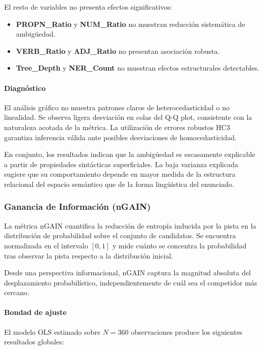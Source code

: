 \documentclass[../main.tex]{subfiles}
\begin{document}
El resto de variables no presenta efectos significativos:

\begin{itemize}
\item \textbf{PROPN\_Ratio} y \textbf{NUM\_Ratio} no muestran reducción sistemática de ambigüedad.
\item \textbf{VERB\_Ratio} y \textbf{ADJ\_Ratio} no presentan asociación robusta.
\item \textbf{Tree\_Depth} y \textbf{NER\_Count} no muestran efectos estructurales detectables.
\end{itemize}

\paragraph{Diagnóstico}

El análisis gráfico no muestra patrones claros de heterocedasticidad o no linealidad. Se observa ligera desviación en colas del Q-Q plot, consistente con la naturaleza acotada de la métrica. La utilización de errores robustos HC3 garantiza inferencia válida ante posibles desviaciones de homocedasticidad.

En conjunto, los resultados indican que la ambigüedad es escasamente explicable a partir de propiedades sintácticas superficiales. La baja varianza explicada sugiere que su comportamiento depende en mayor medida de la estructura relacional del espacio semántico que de la forma lingüística del enunciado.

\subsubsection{Ganancia de Información (nGAIN)}

La métrica nGAIN cuantifica la reducción de entropía inducida por la pista en la distribución de probabilidad sobre el conjunto de candidatos. Se encuentra normalizada en el intervalo $[0,1]$ y mide cuánto se concentra la probabilidad tras observar la pista respecto a la distribución inicial.

Desde una perspectiva informacional, nGAIN captura la magnitud absoluta del desplazamiento probabilístico, independientemente de cuál sea el competidor más cercano.

\paragraph{Bondad de ajuste}

El modelo OLS estimado sobre $N = 360$ observaciones produce los siguientes resultados globales:
\end{document}
